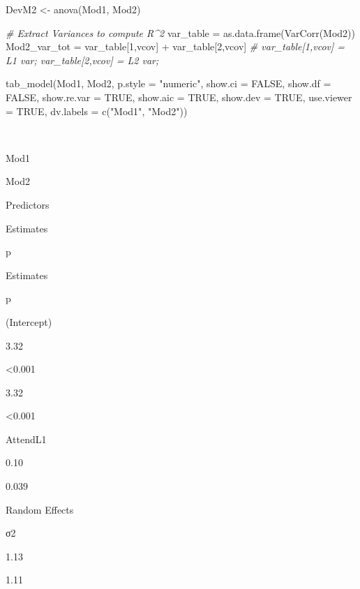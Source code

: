 \documentclass[
  11pt,
]{book}
\newenvironment{Shaded}{\begin{snugshade}}{\end{snugshade}}
\newcommand{\AttributeTok}[1]{\textcolor[rgb]{0.77,0.63,0.00}{#1}}
\newcommand{\CommentTok}[1]{\textcolor[rgb]{0.56,0.35,0.01}{\textit{#1}}}
\newcommand{\ConstantTok}[1]{\textcolor[rgb]{0.00,0.00,0.00}{#1}}
\newcommand{\DecValTok}[1]{\textcolor[rgb]{0.00,0.00,0.81}{#1}}
\newcommand{\FunctionTok}[1]{\textcolor[rgb]{0.00,0.00,0.00}{#1}}
\newcommand{\NormalTok}[1]{#1}
\newcommand{\OtherTok}[1]{\textcolor[rgb]{0.56,0.35,0.01}{#1}}
\newcommand{\SpecialCharTok}[1]{\textcolor[rgb]{0.00,0.00,0.00}{#1}}
\newcommand{\StringTok}[1]{\textcolor[rgb]{0.31,0.60,0.02}{#1}}
\begin{document}
\begin{Shaded}
\begin{Highlighting}[]
\NormalTok{DevM2 }\OtherTok{\textless{}{-}} \FunctionTok{anova}\NormalTok{(Mod1, Mod2) }

\CommentTok{\# Extract Variances to compute R\^{}2}
\NormalTok{  var\_table }\OtherTok{=} \FunctionTok{as.data.frame}\NormalTok{(}\FunctionTok{VarCorr}\NormalTok{(Mod2))}
\NormalTok{  Mod2\_var\_tot }\OtherTok{=}\NormalTok{ var\_table[}\DecValTok{1}\NormalTok{,}\StringTok{\textquotesingle{}vcov\textquotesingle{}}\NormalTok{] }\SpecialCharTok{+}\NormalTok{ var\_table[}\DecValTok{2}\NormalTok{,}\StringTok{\textquotesingle{}vcov\textquotesingle{}}\NormalTok{] }\CommentTok{\# var\_table[1,\textquotesingle{}vcov\textquotesingle{}] = L1 var; var\_table[2,\textquotesingle{}vcov\textquotesingle{}] = L2 var; }

\FunctionTok{tab\_model}\NormalTok{(Mod1, Mod2, }\AttributeTok{p.style =} \StringTok{"numeric"}\NormalTok{, }\AttributeTok{show.ci =} \ConstantTok{FALSE}\NormalTok{, }\AttributeTok{show.df =} \ConstantTok{FALSE}\NormalTok{, }\AttributeTok{show.re.var =} \ConstantTok{TRUE}\NormalTok{, }\AttributeTok{show.aic =} \ConstantTok{TRUE}\NormalTok{, }\AttributeTok{show.dev =} \ConstantTok{TRUE}\NormalTok{, }\AttributeTok{use.viewer =} \ConstantTok{TRUE}\NormalTok{, }\AttributeTok{dv.labels =} \FunctionTok{c}\NormalTok{(}\StringTok{"Mod1"}\NormalTok{, }\StringTok{"Mod2"}\NormalTok{))}
\end{Highlighting}
\end{Shaded}

~

Mod1

Mod2

Predictors

Estimates

p

Estimates

p

(Intercept)

3.32

\textless0.001

3.32

\textless0.001

AttendL1

0.10

0.039

Random Effects

σ2

1.13

1.11
\end{document}
